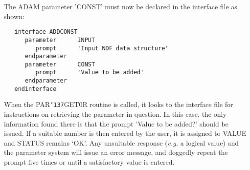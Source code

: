 \documentclass[twoside,11pt]{article}
\renewcommand{\_}{{\tt\char'137}}
\begin{document}
The ADAM parameter 'CONST' must now be declared in the interface file as 
shown:
\begin{verbatim}
   interface ADDCONST
      parameter      INPUT         
         prompt      'Input NDF data structure'
      endparameter
      parameter      CONST          
         prompt      'Value to be added'
      endparameter
   endinterface
\end{verbatim}
When the PAR\_GET0R routine is called, it looks to the interface file
for instructions on retrieving the parameter in question.
In this case, the only information found there is that the
prompt 'Value to be added?' should be issued.
If a suitable number is then entered by the user, it is assigned to VALUE
and STATUS remains `OK'.
Any unsuitable response ({\it e.g.} a logical value) and the parameter 
system will
issue an error message, and doggedly repeat the prompt five times or until
a satisfactory value is entered.
\end{document}

